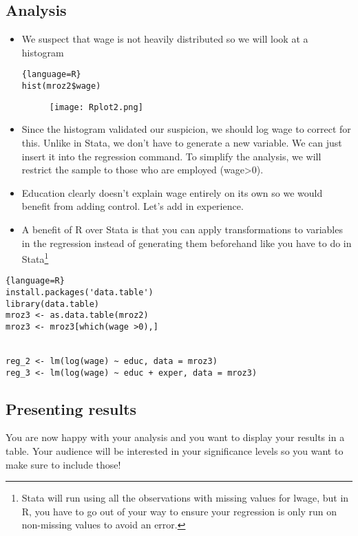 \documentclass[12pt]{article}%
\begin{document}
\subsection{Analysis}
\begin{itemize}


\item We suspect that wage is not heavily distributed so we will look at a histogram \\ 
\begin{lstlisting}{language=R}
hist(mroz2$wage)
\end{lstlisting}
\begin{figure}[h]\centering
\texttt{[image: Rplot2.png]}
\end{figure}
\item Since the histogram validated our suspicion, we should log wage to correct for this. Unlike in Stata, we don't have to generate a new variable. We can just insert it into the regression command. To simplify the analysis, we will restrict the sample to those who are employed (wage>0). 

\item Education clearly doesn't explain wage entirely on its own so we would benefit from adding control. Let's add in experience. 
\item A benefit of R over Stata is that you can apply transformations to variables in the regression instead of generating them beforehand like you have to do in Stata\footnote{Stata will run using all the observations with missing values for lwage, but in R, you have to go out of your way to ensure your regression is only run on non-missing values to avoid an error.}
\end{itemize}

\begin{lstlisting}{language=R}
install.packages('data.table')
library(data.table)
mroz3 <- as.data.table(mroz2)
mroz3 <- mroz3[which(wage >0),]


reg_2 <- lm(log(wage) ~ educ, data = mroz3) 
reg_3 <- lm(log(wage) ~ educ + exper, data = mroz3)
\end{lstlisting} 
\subsection{Presenting results}
You are now happy with your analysis and you want to display your results in a table. Your audience will be interested in your significance levels so you want to make sure to include those!\\
\end{document}
